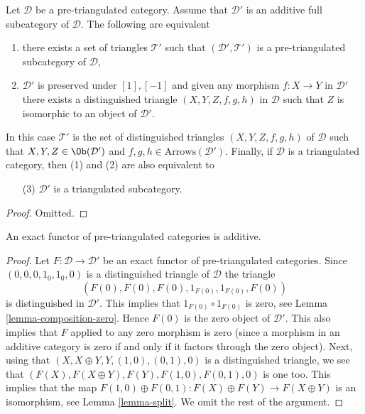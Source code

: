 \begin{lemma}
\label{lemma-triangulated-subcategory}
Let $\mathcal{D}$ be a pre-triangulated category.
Assume that $\mathcal{D}'$ is an additive full subcategory of $\mathcal{D}$.
The following are equivalent
\begin{enumerate}
\item there exists a set of triangles $\mathcal{T}'$ such that
$(\mathcal{D}', \mathcal{T}')$ is a pre-triangulated subcategory
of $\mathcal{D}$,
\item $\mathcal{D}'$ is preserved under $[1], [-1]$ and
given any morphism $f : X \to Y$ in $\mathcal{D}'$ there exists
a distinguished triangle $(X, Y, Z, f, g, h)$ in $\mathcal{D}$
such that $Z$ is isomorphic to an object of $\mathcal{D}'$.
\end{enumerate}
In this case $\mathcal{T}'$ is the set of distinguished triangles
$(X, Y, Z, f, g, h)$ of $\mathcal{D}$ such that
$X, Y, Z \in \Ob(\mathcal{D}')$ and
$f, g, h \in \text{Arrows}(\mathcal{D}')$. Finally, if $\mathcal{D}$
is a triangulated category, then (1) and (2) are also equivalent to
\begin{enumerate}
\item[(3)] $\mathcal{D}'$ is a triangulated subcategory.
\end{enumerate}
\end{lemma}

\begin{proof}
Omitted.
\end{proof}

\begin{lemma}
\label{lemma-exact-functor-additive}
An exact functor of pre-triangulated categories is additive.
\end{lemma}

\begin{proof}
Let $F : \mathcal{D} \to \mathcal{D}'$ be an exact functor of
pre-triangulated categories. Since
$(0, 0, 0, 1_0, 1_0, 0)$ is a distinguished triangle of $\mathcal{D}$
the triangle
$$
(F(0), F(0), F(0), 1_{F(0)}, 1_{F(0)}, F(0))
$$
is distinguished in $\mathcal{D}'$.
This implies that $1_{F(0)} \circ 1_{F(0)}$ is zero, see
Lemma \ref{lemma-composition-zero}.
Hence $F(0)$ is the zero object of $\mathcal{D}'$. This also implies
that $F$ applied to any zero morphism is zero (since a morphism in
an additive category is zero if and only if it factors through the
zero object). Next, using that
$(X, X \oplus Y, Y, (1, 0), (0, 1), 0)$ is a distinguished triangle,
we see that $(F(X), F(X \oplus Y), F(Y), F(1, 0), F(0, 1), 0)$ is
one too. This implies that the map
$F(1, 0) \oplus F(0, 1) : F(X) \oplus F(Y) \to F(X \oplus Y)$
is an isomorphism, see
Lemma \ref{lemma-split}.
We omit the rest of the argument.
\end{proof}

